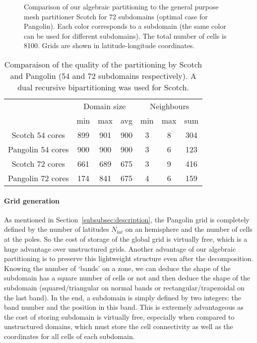 \begin{figure}
  \hfill
  \caption{%
    Comparison of our algebraic partitioning
     to the general purpose mesh
    partitioner Scotch  for 72 subdomains
    (optimal case for Pangolin).  Each color corresponds to a subdomain (the
    same color can be used for different subdomains). The total number of
    cells is 8100. Grids are shown in latitude-longitude coordinates.
  }
\label{fig:72_domains}
\end{figure}

\begin{table}
 \centering
  \begin{tabular}{*{7}{c}}
    \toprule
    & \multicolumn{3}{c}{Domain size} & \multicolumn{3}{c}{Neighbours} \\
     \cmidrule(r){2-7}
    & min & max & avg & min & max & sum \\
     \midrule
    Scotch 54 cores & 899 & 901 & 900 & 3   & 8   & 304\\
    Pangolin 54 cores & 900 & 900 & 900 & 3   & 6   & 123 \\
     \midrule
    Scotch  72 cores & 661 & 689 & 675 & 3   & 9   & 416\\
    Pangolin 72 cores & 174 & 841 & 675 & 4   & 6   & 159 \\
    \bottomrule
  \end{tabular}
  \caption{Comparaison of the quality of the partitioning by Scotch and Pangolin
  (54 and 72 subdomains respectively). A dual recursive
    bipartitioning was used for Scotch.}
\label{tab:scotch_compare}
\end{table}

\paragraph{Grid generation}
As mentioned in Section~\ref{subsubsec:description}, the Pangolin grid is
completely defined by the number of latitudes $N_{lat}$ on an hemisphere and the
number of cells at the poles. So the cost of storage of the global grid is
virtually free, which is a huge advantage over unstructured grids.  Another
advantage of our algebraic partitioning is to preserve this lightweight
structure even after the decomposition. Knowing the number of `bands' on
a zone, we can deduce the shape of the subdomain has a square number of cells or
not and then deduce the shape of the subdomain (squared/triangular on normal
bands or rectangular/trapezoidal on the last band). In the end, a subdomain is
simply defined by two integers: the band number and the position in this band.
This is extremely advantageous as the cost of storing subdomain is virtually
free, especially when compared to unstructured domains, which must store the
cell connectivity as well as the coordinates for all cells of each subdomain. 

